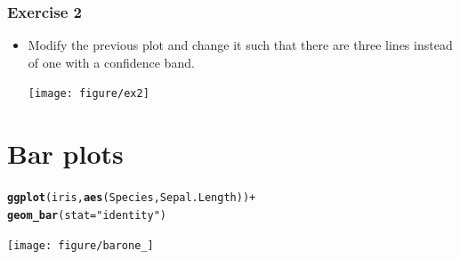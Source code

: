 \documentclass{beamer}\usepackage[]{graphicx}\usepackage[]{color}
\makeatletter
\newcommand{\hlstr}[1]{\textcolor[rgb]{0.192,0.494,0.8}{#1}}%
\newcommand{\hlkwd}[1]{\textcolor[rgb]{0.737,0.353,0.396}{\textbf{#1}}}%
\newenvironment{kframe}{%
 \def\at@end@of@kframe{}%
 \ifinner\ifhmode%
  \def\at@end@of@kframe{\end{minipage}}%
  \begin{minipage}{\columnwidth}%
 \fi\fi%
 \def\FrameCommand##1{\hskip\@totalleftmargin \hskip-\fboxsep
 \colorbox{shadecolor}{##1}\hskip-\fboxsep
     \hskip-\linewidth \hskip-\@totalleftmargin \hskip\columnwidth}%
 \MakeFramed {\advance\hsize-\width
   \@totalleftmargin\z@ \linewidth\hsize
   \@setminipage}}%
 {\par\unskip\endMakeFramed%
 \at@end@of@kframe}
\newenvironment{knitrout}{}{} %
\makeatother
\begin{document}

\begin{frame}[fragile]
\frametitle{Exercise 2}
\begin{itemize}
\item Modify the previous plot and change it such that there are three lines instead of one with a confidence band.
\begin{knitrout}\footnotesize
{}\color{fgcolor}

{\centering \texttt{[image: figure/ex2]} 

}



\end{knitrout}


\end{itemize}
\end{frame}


\section*{Bar plots}
\frame{\sectionpage}


\begin{frame}[fragile]
\begin{knitrout}\footnotesize
{}\color{fgcolor}\begin{kframe}
\begin{alltt}
\hlkwd{ggplot}(iris, \hlkwd{aes}(Species, Sepal.Length)) +
\hlkwd{geom_bar}(stat = \hlstr{"identity"})
\end{alltt}
\end{kframe}

{\centering \texttt{[image: figure/barone\_]} 

}



\end{knitrout}

\end{frame}

\end{document}
